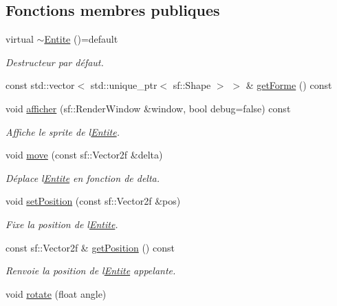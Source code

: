 \subsection*{Fonctions membres publiques}
\begin{DoxyCompactItemize}
\item 
virtual \hyperlink{class_entite_a8084762a25afbfbcdca31121a3dfcd87}{$\sim$\+Entite} ()=default
\begin{DoxyCompactList}\small\item\em Destructeur par défaut. \end{DoxyCompactList}\item 
const std\+::vector$<$ std\+::unique\+\_\+ptr$<$ sf\+::\+Shape $>$ $>$ \& \hyperlink{class_entite_ae01177a102251100c96e2060372627ad}{get\+Forme} () const
\item 
void \hyperlink{class_entite_a91874d7e87f6cb479a3893fbedc6a4e3}{afficher} (sf\+::\+Render\+Window \&window, bool debug=false) const
\begin{DoxyCompactList}\small\item\em Affiche le sprite de l\textquotesingle{}\hyperlink{class_entite}{Entite}. \end{DoxyCompactList}\item 
void \hyperlink{class_entite_ac409613f3cf67cae14babd4b16811c8f}{move} (const sf\+::\+Vector2f \&delta)
\begin{DoxyCompactList}\small\item\em Déplace l\textquotesingle{}\hyperlink{class_entite}{Entite} en fonction de {\itshape delta}. \end{DoxyCompactList}\item 
void \hyperlink{class_entite_aa7fe4a7ebd8eb4c80ef9fdb7d97f2dad}{set\+Position} (const sf\+::\+Vector2f \&pos)
\begin{DoxyCompactList}\small\item\em Fixe la position de l\textquotesingle{}\hyperlink{class_entite}{Entite}. \end{DoxyCompactList}\item 
const sf\+::\+Vector2f \& \hyperlink{class_entite_a6f6fd1e1f9f6ad44f0ecc74961a774d9}{get\+Position} () const
\begin{DoxyCompactList}\small\item\em Renvoie la position de l\textquotesingle{}\hyperlink{class_entite}{Entite} appelante. \end{DoxyCompactList}\item 
void \hyperlink{class_entite_af1249039d313e4e691a109440663eae7}{rotate} (float angle)

\end{DoxyCompactItemize}
